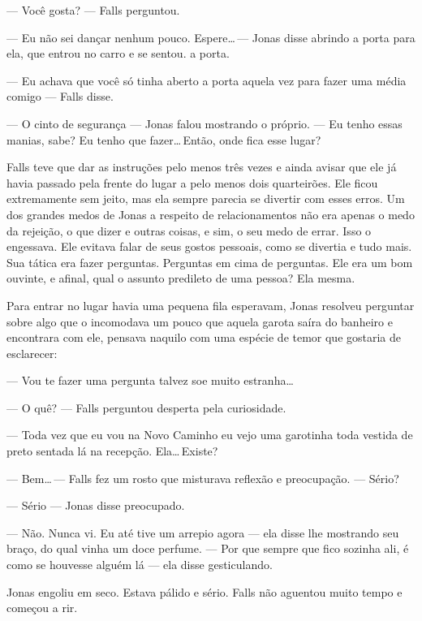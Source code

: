 --- Você gosta? --- Falls perguntou.

--- Eu não sei dançar nenhum pouco. Espere\ldots\,--- Jonas disse\mudanca{,} abrindo a porta para ela, que entrou no carro e se sentou.  a porta.

--- Eu achava que você só tinha aberto a porta aquela vez para fazer uma média comigo --- Falls disse.

--- O cinto de segurança --- Jonas falou mostrando o próprio. --- Eu tenho essas manias, sabe? Eu tenho que fazer\ldots\,Então, onde fica esse lugar?

Falls teve que dar as instruções pelo menos três vezes e ainda avisar que ele já havia passado pela frente do lugar a pelo menos dois quarteirões. Ele ficou extremamente sem jeito, mas ela sempre parecia se divertir com esses erros. Um dos grandes medos de Jonas a respeito de relacionamentos não era apenas o medo da rejeição, o que dizer e outras coisas, e sim, o seu medo de errar. Isso o engessava. Ele evitava falar de seus gostos pessoais, como se divertia e tudo mais. Sua tática era fazer perguntas. Perguntas em cima de perguntas. Ele era um bom ouvinte, e afinal, qual o assunto predileto de uma pessoa? Ela mesma.

Para entrar no lugar havia uma pequena fila esperavam, Jonas resolveu perguntar sobre algo que o incomodava um pouco que aquela garota saíra do banheiro e  encontrara com ele, pensava naquilo com uma espécie de temor que gostaria de esclarecer:

--- Vou te fazer uma pergunta  talvez soe muito estranha\ldots

--- O quê? --- Falls perguntou\mudanca{,} desperta pela curiosidade.

--- Toda vez que eu vou na Novo Caminho eu vejo uma garotinha toda vestida de preto sentada lá na recepção. Ela\ldots\,Existe?

--- Bem\ldots\,--- Falls fez um rosto que misturava reflexão e preocupação. --- Sério?

--- Sério --- Jonas disse preocupado.

--- Não. Nunca vi. Eu até tive um arrepio agora --- ela disse lhe mostrando seu braço, do qual vinha um doce perfume. --- Por que sempre que fico sozinha ali, é como se houvesse alguém lá --- ela disse gesticulando.

Jonas engoliu em seco. Estava pálido e sério. Falls não aguentou muito tempo e começou a rir.

